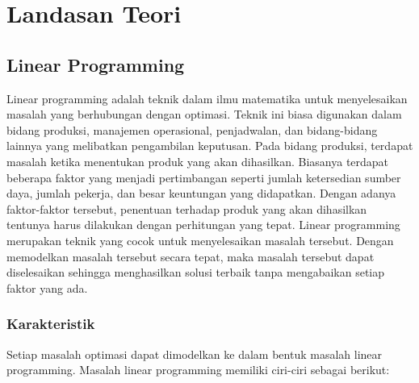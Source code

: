 \chapter{Landasan Teori}
\label{chap:teori}

\section{Linear Programming}
\label{linear_programming}

Linear programming adalah teknik dalam ilmu matematika untuk menyelesaikan masalah yang berhubungan dengan optimasi. Teknik ini biasa digunakan dalam bidang produksi, manajemen operasional, penjadwalan, dan bidang-bidang lainnya yang melibatkan pengambilan keputusan. Pada bidang produksi, terdapat masalah ketika menentukan produk yang akan dihasilkan. Biasanya terdapat beberapa faktor yang menjadi pertimbangan seperti jumlah ketersedian sumber daya, jumlah pekerja, dan besar keuntungan yang didapatkan. Dengan adanya faktor-faktor tersebut, penentuan terhadap produk yang akan dihasilkan tentunya harus dilakukan dengan perhitungan yang tepat. Linear programming merupakan teknik yang cocok untuk menyelesaikan masalah tersebut. Dengan memodelkan masalah tersebut secara tepat, maka masalah tersebut dapat diselesaikan sehingga menghasilkan solusi terbaik tanpa mengabaikan setiap faktor yang ada.

\subsection{Karakteristik}
\label{karakteristik}

Setiap masalah optimasi dapat dimodelkan ke dalam bentuk masalah linear programming. Masalah linear programming memiliki ciri-ciri sebagai berikut:

